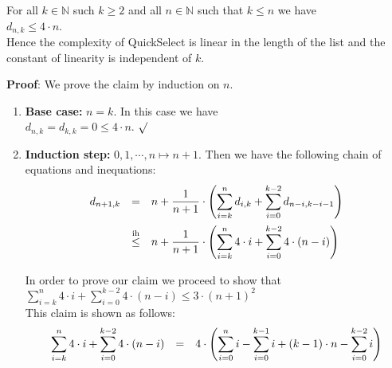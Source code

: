 \documentclass{article}
\newcommand{\green}[1]{{\color{darkgreen}#1}}
\newcommand{\ds}{\displaystyle}
\begin{document}
\begin{Theorem}
  For all $k \in \mathbb{N}$ such $k \geq 2$ and all $n \in \mathbb{N}$ such that $k \leq n$ we have
  \\[0.2cm]
  \hspace*{1.3cm}
  $\ds d_{n, k} \leq 4 \cdot n$.
  \\[0.2cm]
  Hence the complexity of QuickSelect is linear in the length of the list and the constant of linearity is
  independent of $k$. 
\end{Theorem}

\noindent
\textbf{Proof}: We prove the claim by induction on $n$.
\begin{enumerate}
\item[] \textbf{Base case:} $n = k$.  In this case we have
             \\[0.2cm]
             \hspace*{1.3cm}
             $d_{n,k} = d_{k,k} = 0 \leq 4 \cdot n$. \green{$\surd$}
\item[] \textbf{Induction step:} $0,1,\cdots,n \mapsto n+1$. Then we have the following chain of equations and inequations:
            $$
            \begin{array}{{lcl}}
              d_{n+1,k} & = & \ds n + \frac{1}{n+1} \cdot \left(\sum\limits_{i=k}^n d_{i,k} + \sum\limits_{i=0}^{k-2}
                              d_{n-i,k-i-1}\right)  \\[0.5cm]
                      & \stackrel{\mathrm{ih}}{\leq} & \ds
                        n + \frac{1}{n+1} \cdot \left(\sum\limits_{i=k}^n 4 \cdot i + \sum\limits_{i=0}^{k-2}
                                                       4 \cdot (n-i) \right)  \\[0.5cm]
            \end{array}
            $$
            In order to prove our claim we proceed to show that
            \\[0.2cm]
            \hspace*{1.3cm}
            $\ds \sum\limits_{i=k}^n 4 \cdot i + \sum\limits_{i=0}^{k-2} 4 \cdot (n-i) \leq 3 \cdot (n+1)^2$
            \\[0.2cm] 
            This claim is shown as follows:
            $$
            \begin{array}{{lcl}}
                  \ds \sum\limits_{i=k}^n 4 \cdot i + \sum\limits_{i=0}^{k-2} 4 \cdot (n-i)
              &=& \ds 4\cdot \left(\sum\limits_{i=0}^n i - \sum\limits_{i=0}^{k-1} i + (k-1) \cdot n -
                  \sum\limits_{i=0}^{k-2} i\right) \\[0.5cm] 

\end{array}$$
\end{enumerate}
\end{document}
